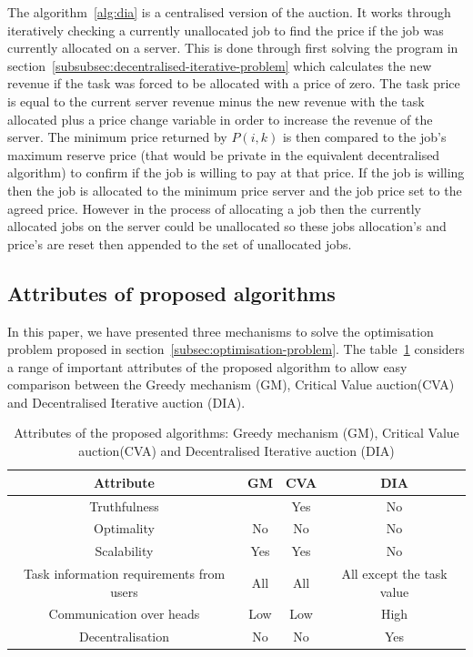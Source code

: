 The algorithm~\ref{alg:dia} is a centralised version of the auction. It works through iteratively checking a currently
unallocated job to find the price if the job was currently allocated on a server. This is done through first solving
the program in section~\ref{subsubsec:decentralised-iterative-problem} which calculates the new revenue if the task was
forced to be allocated with a price of zero. The task price is equal to the current server revenue minus the new
revenue with the task allocated plus a price change variable in order to increase the revenue of the server. The
minimum price returned by $P(i, k)$ is then compared to the job's maximum reserve price (that would be private in the
equivalent decentralised algorithm) to confirm if the job is willing to pay at that price. If the job is willing then
the job is allocated to the minimum price server and the job price set to the agreed price. However in the process of
allocating a job then the currently allocated jobs on the server could be unallocated so these jobs allocation's and
price's are reset then appended to the set of unallocated jobs.


\subsection{Attributes of proposed algorithms}\label{subsec:attributes-of-proposed-algorithms}
In this paper, we have presented three mechanisms to solve the optimisation problem proposed in
section~\ref{subsec:optimisation-problem}. The table~\ref{tab:attributes_algorithms} considers a range of
important attributes of the proposed algorithm to allow easy comparison between the Greedy mechanism (GM),
Critical Value auction(CVA) and Decentralised Iterative auction (DIA).

\begin{table}[H]
    \centering
    \begin{tabular}{|c|c|c|c|}
        \hline
        Attribute                           & GM  & CVA & DIA                   \\ \hline
        Truthfulness                        &     & Yes & No                    \\ \hline
        Optimality                          & No  & No  & No                    \\ \hline
        Scalability                         & Yes & Yes & No                    \\ \hline
        Task information requirements from users & All & All & All except the task value \\ \hline
        Communication over heads            & Low & Low & High                  \\ \hline
        Decentralisation                    & No  & No  & Yes                   \\ \hline
    \end{tabular}
    \caption{Attributes of the proposed algorithms: Greedy mechanism (GM), Critical Value auction(CVA) and Decentralised Iterative auction (DIA)}
    \label{tab:attributes_algorithms}
\end{table}
